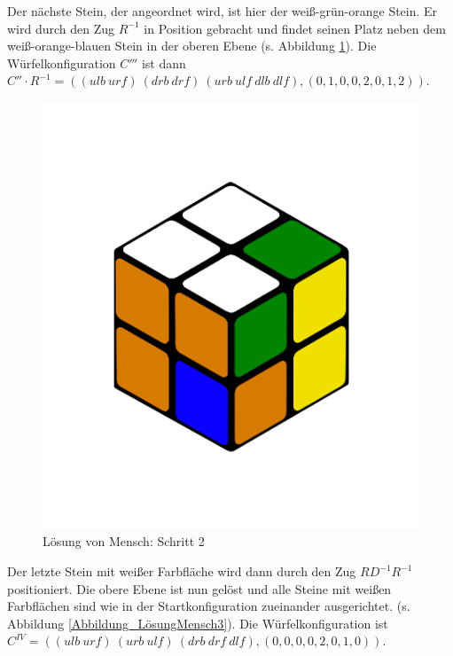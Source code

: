 \documentclass[12pt,a4paper, usenames, dvipsnames]{article}
\theoremstyle{mystyle}
\theoremstyle{definition}
\begin{document}
Der nächste Stein, der angeordnet wird, ist hier der weiß-grün-orange Stein. Er wird durch den Zug $R^{-1}$ in Position gebracht und findet seinen Platz neben dem weiß-orange-blauen Stein in der oberen Ebene (s. Abbildung \ref{Abbildung_LösungMensch2}). Die Würfelkonfiguration $C'''$ ist dann $C'' \cdot R^{-1} = (( \textit{ulb} \ \textit{urf} ) \ ( \textit{drb} \ \textit{drf} ) \ ( \textit{urb} \ \textit{ulf} \ \textit{dlb} \ \textit{dlf}),(0,1,0,0,2,0,1,2))$.
 
\begin{figure}[H]
\centering
\includegraphics[scale=0.12]{menschSchritt2.png}
\caption[Lösung von Mensch: Schritt 2]{Lösung von Mensch: Schritt 2}
\label{Abbildung_LösungMensch2}
\end{figure}

Der letzte Stein mit weißer Farbfläche wird dann durch den Zug $RD^{-1}R^{-1}$ positioniert. Die obere Ebene ist nun gelöst und alle Steine mit weißen Farbflächen sind wie in der Startkonfiguration zueinander ausgerichtet. (s. Abbildung \ref{Abbildung_LösungMensch3}).
Die Würfelkonfiguration ist $C^{IV}=(( \textit{ulb} \ \textit{urf} ) \ ( \textit{urb} \ \textit{ulf} ) \ ( \textit{drb} \ \textit{drf} \ \textit{dlf} ),(0,0,0,0,2,0,1,0))$.
\end{document}
